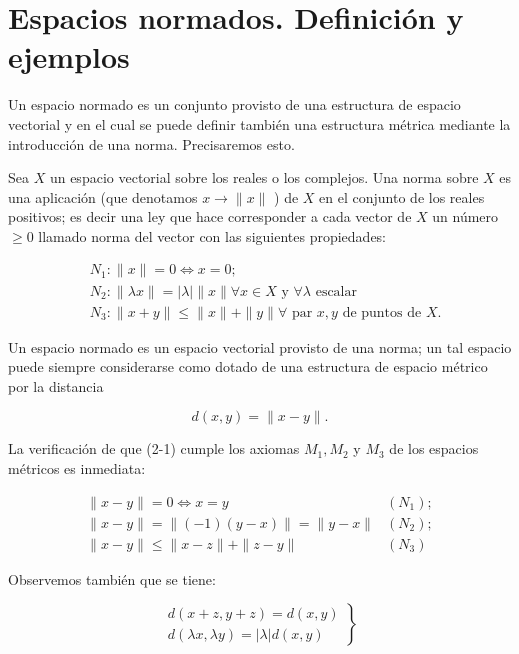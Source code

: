 \documentclass[10pt]{article}
\theoremstyle{plain}
\theoremstyle{definition}
\theoremstyle{remark}
\begin{document}
\section{Espacios normados. Definición y ejemplos}
Un espacio normado es un conjunto provisto de una estructura de espacio vectorial y en el cual se puede definir también una estructura métrica mediante la introducción de una norma. Precisaremos esto.

Sea $X$ un espacio vectorial sobre los reales o los complejos. Una norma sobre $X$ es una aplicación (que denotamos $x \rightarrow\|x\|$ ) de $X$ en el conjunto de los reales positivos; es decir una ley que hace corresponder a cada vector de $X$ un número $\geqslant 0$ llamado norma del vector con las siguientes propiedades:

$$
\begin{aligned}
& N_{1}:\|x\|=0 \Longleftrightarrow x=0 ; \\
& N_{2}:\|\lambda x\|=|\lambda|\|x\| \forall x \in X \text { y } \forall \lambda \text { escalar } \\
& N_{3}:\|x+y\| \leqslant\|x\|+\|y\| \forall \text { par } x, y \text { de puntos de } X .
\end{aligned}
$$

Un espacio normado es un espacio vectorial provisto de una norma; un tal espacio puede siempre considerarse como dotado de una estructura de espacio métrico por la distancia


\begin{equation*}
d(x, y)=\|x-y\| . \tag{2-1}
\end{equation*}


La verificación de que (2-1) cumple los axiomas $M_{1}, M_{2}$ y $M_{3}$ de los espacios métricos es inmediata:

$$
\begin{array}{ll}
\|x-y\|=0 \Longleftrightarrow x=y & \left(N_{1}\right) ; \\
\|x-y\|=\|(-1)(y-x)\|=\|y-x\| & \left(N_{2}\right) ; \\
\|x-y\| \leqslant\|x-z\|+\|z-y\| & \left(N_{3}\right)
\end{array}
$$

Observemos también que se tiene:

\[
\left.\begin{array}{l}
d(x+z, y+z)=d(x, y)  \tag{2-2}\\
d(\lambda x, \lambda y)=|\lambda| d(x, y)
\end{array}\right\}
\]
\end{document}
